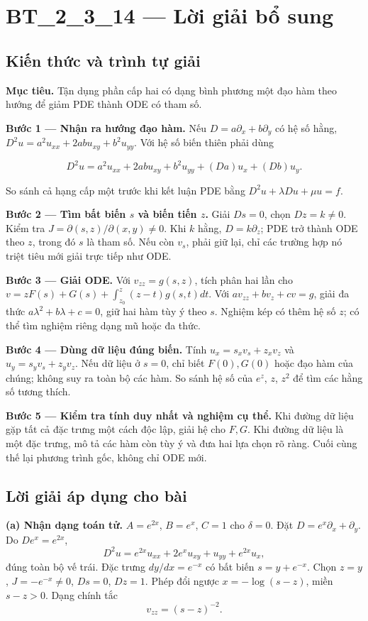 \documentclass[10pt,a4paper]{article}
\begin{document}
\section*{BT\_2\_3\_14 — Lời giải bổ sung}
\subsection*{Kiến thức và trình tự giải}
\textbf{Mục tiêu.} Tận dụng phần cấp hai có dạng bình phương một đạo hàm theo hướng để giảm PDE thành ODE có tham số.

\textbf{Bước 1 — Nhận ra hướng đạo hàm.} Nếu $D=a\partial_x+b\partial_y$ có hệ số hằng, $D^2u=a^2u_{xx}+2ab u_{xy}+b^2u_{yy}$. Với hệ số biến thiên phải dùng


\[
D^2u=a^2u_{xx}+2ab u_{xy}+b^2u_{yy}+(Da)u_x+(Db)u_y.
\]


So sánh cả hạng cấp một trước khi kết luận PDE bằng $D^2u+\lambda Du+\mu u=f$.

\textbf{Bước 2 — Tìm bất biến $s$ và biến tiến $z$.} Giải $Ds=0$, chọn $Dz=k\ne0$. Kiểm tra $J=\partial(s,z)/\partial(x,y)\ne0$. Khi $k$ hằng, $D=k\partial_z$; PDE trở thành ODE theo $z$, trong đó $s$ là tham số. Nếu còn $v_s$, phải giữ lại, chỉ các trường hợp nó triệt tiêu mới giải trực tiếp như ODE.

\textbf{Bước 3 — Giải ODE.} Với $v_{zz}=g(s,z)$, tích phân hai lần cho $v=zF(s)+G(s)+\int_{z_0}^z(z-t)g(s,t)dt$. Với $a v_{zz}+b v_z+c v=g$, giải đa thức $a\lambda^2+b\lambda+c=0$, giữ hai hàm tùy ý theo $s$. Nghiệm kép có thêm hệ số $z$; có thể tìm nghiệm riêng dạng mũ hoặc đa thức.

\textbf{Bước 4 — Dùng dữ liệu đúng biến.} Tính $u_x=s_xv_s+z_xv_z$ và $u_y=s_yv_s+z_yv_z$. Nếu dữ liệu ở $s=0$, chỉ biết $F(0),G(0)$ hoặc đạo hàm của chúng; không suy ra toàn bộ các hàm. So sánh hệ số của $e^z$, $z$, $z^2$ để tìm các hằng số tương thích.

\textbf{Bước 5 — Kiểm tra tính duy nhất và nghiệm cụ thể.} Khi đường dữ liệu gặp tất cả đặc trưng một cách độc lập, giải hệ cho $F,G$. Khi đường dữ liệu là một đặc trưng, mô tả các hàm còn tùy ý và đưa hai lựa chọn rõ ràng. Cuối cùng thế lại phương trình gốc, không chỉ ODE mới.
\subsection*{Lời giải áp dụng cho bài}
\textbf{(a) Nhận dạng toán tử.} $A=e^{2x}$, $B=e^x$, $C=1$ cho $\delta=0$. Đặt $D=e^x\partial_x+\partial_y$. Do $De^x=e^{2x}$,
\[D^2u=e^{2x}u_{xx}+2e^xu_{xy}+u_{yy}+e^{2x}u_x,\]
đúng toàn bộ vế trái. Đặc trưng $dy/dx=e^{-x}$ có bất biến $s=y+e^{-x}$. Chọn $z=y$, $J=-e^{-x}\ne0$, $Ds=0$, $Dz=1$. Phép đổi ngược $x=-\log(s-z)$, miền $s-z>0$. Dạng chính tắc
\[v_{zz}=(s-z)^{-2}.\]
\end{document}
